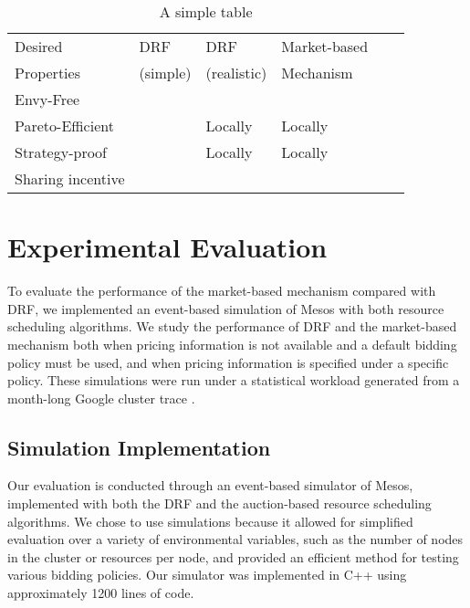 \documentclass{acm_proc_article-sp}
\newcommand{\cmark}{\ding{51}}%
\begin{document}
\begin{table*}[t!]
\begin{center}
    \begin{tabular}{| l | l | l | l | l | l |}
    \hline
    Desired & \small DRF & \small DRF & \small Market-based  \\
    Properties & \small(simple) & \small (realistic) & \small Mechanism \\
    \hline
    \small Envy-Free & \cmark &  & \cmark \\
    \small Pareto-Efficient & \cmark & Locally & Locally  \\
    \small Strategy-proof & \cmark & Locally  & Locally \\
    \small Sharing incentive & \cmark &  & \cmark\\
    \hline
    \end{tabular}
\end{center}
  \caption{A simple table}
  \label{table:props}
\end{table*}


\section{Experimental Evaluation}
\label{sec:eval}

To evaluate the performance of the market-based mechanism compared with DRF,
we implemented an event-based simulation of Mesos with both resource scheduling algorithms.
We study the performance of DRF and the market-based mechanism both when pricing information is not available and a default bidding policy must be used, and when pricing information is specified under a specific policy. These simulations were run under a statistical workload generated from a month-long Google cluster trace \cite{TODO}.

\subsection{Simulation Implementation\\}

Our evaluation is conducted through an event-based simulator of Mesos, implemented with both the DRF and the auction-based resource scheduling algorithms. We chose to use simulations because it allowed for simplified evaluation over a variety of environmental variables, such as the number of nodes in the cluster or resources per node, and provided an efficient method for testing various bidding policies. Our simulator was implemented in C++ using approximately 1200 lines of code.
\end{document}
